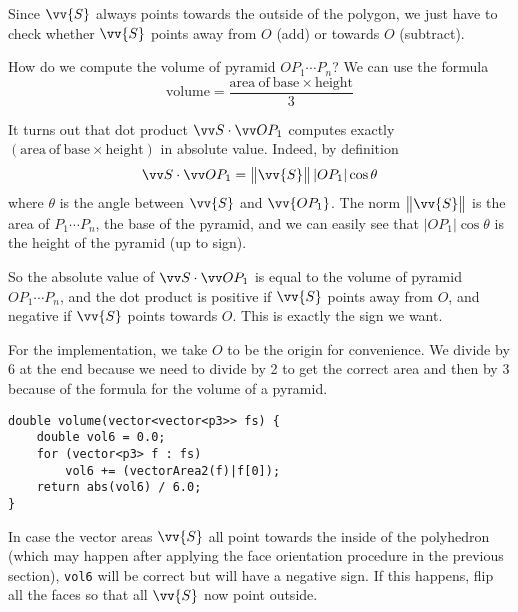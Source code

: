 Since $\vv{S}$ always points towards the outside of the polygon, we just have to check whether $\vv{S}$ points away from $O$ (add) or towards $O$ (subtract).


How do we compute the volume of pyramid $OP_1\cdots P_n$? We can use the formula
\[\mathrm{volume} = \frac{\mathrm{area\ of\ base}\times\mathrm{height}}{3}\]

It turns out that dot product $\dotv{S}{OP_1}$ computes exactly $(\mathrm{area\ of\ base}\times\mathrm{height})$ in absolute value. Indeed, by definition
\[\dotv{S}{OP_1} = \big\|\vv{S}\big\|\,|OP_1|\cos\theta\]
where $\theta$ is the angle between $\vv{S}$ and $\vv{OP_1}$. The norm $\big\|\vv{S}\big\|$ is the area of $P_1\cdots P_n$, the base of the pyramid, and we can easily see that $|OP_1|\cos\theta$ is the height of the pyramid (up to sign).


So the absolute value of $\dotv{S}{OP_1}$ is equal to the volume of pyramid $OP_1\cdots P_n$, and the dot product is positive if $\vv{S}$ points away from $O$, and negative if $\vv{S}$ points towards $O$. This is exactly the sign we want.

For the implementation, we take $O$ to be the origin for convenience. We divide by 6 at the end because we need to divide by 2 to get the correct area and then by 3 because of the formula for the volume of a pyramid.
\begin{lstlisting}
double volume(vector<vector<p3>> fs) {
    double vol6 = 0.0;
    for (vector<p3> f : fs)
        vol6 += (vectorArea2(f)|f[0]);
    return abs(vol6) / 6.0;
}
\end{lstlisting}

In case the vector areas $\vv{S}$ all point towards the inside of the polyhedron (which may happen after applying the face orientation procedure in the previous section), \lstinline|vol6| will be correct but will have a negative sign. If this happens, flip all the faces so that all $\vv{S}$ now point outside.
